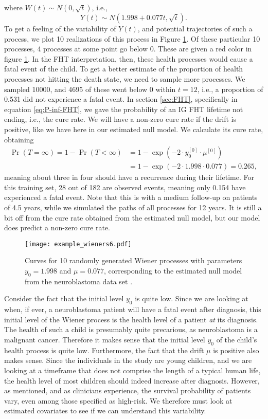 where $W(t)\sim N(0,\sqrt{t})$,
i.e.,
\begin{equation*}
    Y(t)\sim N(1.998+0.077t,\sqrt{t}).
\end{equation*}
To get a feeling of the variability of $Y(t)$, and potential trajectories of such a process, we plot 10 realizations of this process in Figure \ref{fig:neuroblastoma-wien}.
Of these particular 10 processes, 4 processes at some point go below 0.
These are given a red color in figure \ref{fig:neuroblastoma-wien}.
In the FHT interpretation, then, these health processes would cause a fatal event of the child.
To get a better estimate of the proportion of health processes not hitting the death state, we need to sample more processes.
We sampled 10000, and 4695 of these went below 0 within $t=12$, i.e., a proportion of 0.531 did not experience a fatal event.
In section \ref{sec:FHT}, specifically in equation \eqref{eq:P-inf-FHT}, we gave the probability of an IG FHT lifetime not ending, i.e., the cure rate.
We will have a non-zero cure rate if the drift is positive, like we have here in our estimated null model.
We calculate its cure rate, obtaining
\begin{align*}
    \Pr{(T=\infty)}=1-\Pr{(T<\infty)}&=1-\exp{(-2\cdot y_0^{[0]}\cdot\mu^{[0]})}\\
    &=1-\exp{(-2\cdot 1.998\cdot 0.077)}=0.265,
\end{align*}
meaning about three in four should have a recurrence during their lifetime.
For this training set, 28 out of 182 are observed events, meaning only 0.154 have experienced a fatal event.
Note that this is with a medium follow-up on patients of 4.5 years, while we simulated the paths of all processes for 12 years.
It is still a bit off from the cure rate obtained from the estimated null model, but our model does predict a non-zero cure rate.
\begin{figure}
\caption{Curves for 10 randomly generated Wiener processes with parameters $y_0=1.998$ and $\mu=0.077$, corresponding to the estimated null model from the neuroblastoma data set \citep{oberthuer-data}.}
\label{fig:neuroblastoma-wien}
\centering
\texttt{[image: example\_wieners6.pdf]}
\end{figure}

Consider the fact that the initial level $y_0$ is quite low.
Since we are looking at when, if ever, a neuroblastoma patient will have a fatal event after diagnosis, this initial level of the Wiener process is the health level of a patient \textit{at} its diagnosis.
The health of such a child is presumably quite precarious, as neuroblastoma is a malignant cancer.
Therefore it makes sense that the initial level $y_0$ of the child's health process is quite low.
Furthermore, the fact that the drift $\mu$ is positive also makes sense.
Since the individuals in the study are young children, and we are looking at a timeframe that does not comprise the length of a typical human life, the health level of most children should indeed increase after diagnosis.
However, as mentioned, and as clinicians experience, the survival probability of patients vary, even among those specified as high-risk.
We therefore must look at estimated covariates to see if we can understand this variability.

